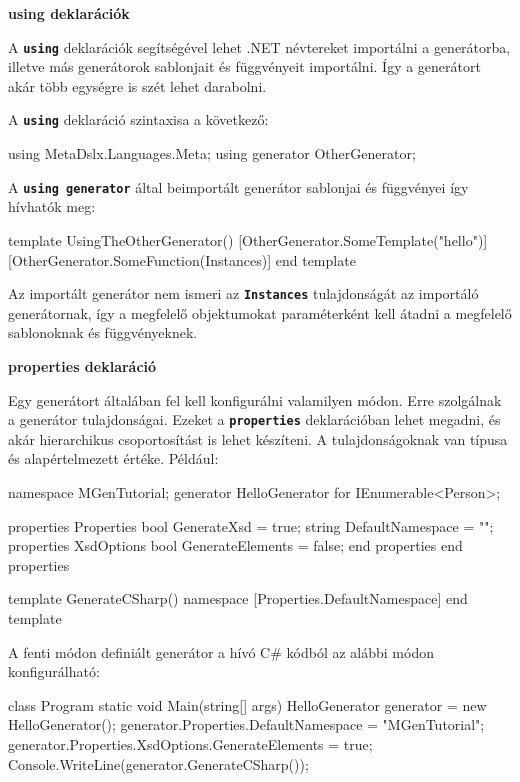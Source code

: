 \documentclass[12pt, a4paper]{report}
\newcommand{\ff}[1]{\textbf{\texttt{#1}}}
\newcommand{\bb}[1]{\textbf{#1}}
\begin{document}
\bb{using deklarációk}

A \ff{using} deklarációk segítségével lehet .NET névtereket importálni a generátorba, illetve más generátorok sablonjait és függvényeit importálni. Így a generátort akár több egységre is szét lehet darabolni.

A \ff{using} deklaráció szintaxisa a következő:

\begin{mgencode}
using MetaDslx.Languages.Meta;
using generator OtherGenerator;
\end{mgencode}

A \ff{using generator} által beimportált generátor sablonjai és függvényei így hívhatók meg:

\begin{mgencode}
template UsingTheOtherGenerator()
[OtherGenerator.SomeTemplate("hello")]
[OtherGenerator.SomeFunction(Instances)]
end template
\end{mgencode}

Az importált generátor nem ismeri az \ff{Instances} tulajdonságát az importáló generátornak, így a megfelelő objektumokat paraméterként kell átadni a megfelelő sablonoknak és függvényeknek.

\bb{properties deklaráció}

Egy generátort általában fel kell konfigurálni valamilyen módon. Erre szolgálnak a generátor tulajdonságai. Ezeket a \ff{properties} deklarációban lehet megadni, és akár hierarchikus csoportosítást is lehet készíteni. A tulajdonságoknak van típusa és alapértelmezett értéke. Például:

\begin{mgencode}
namespace MGenTutorial;
generator HelloGenerator for IEnumerable<Person>;

properties Properties
  bool GenerateXsd = true;
  string DefaultNamespace = "";
  properties XsdOptions
    bool GenerateElements = false;
  end properties
end properties

template GenerateCSharp()
namespace [Properties.DefaultNamespace]
{
}
end template
\end{mgencode}

A fenti módon definiált generátor a hívó C\# kódból az alábbi módon konfigurálható:

\begin{csharpcode}
class Program
{
	static void Main(string[] args)
	{
		HelloGenerator generator = new HelloGenerator();
		generator.Properties.DefaultNamespace = "MGenTutorial";
		generator.Properties.XsdOptions.GenerateElements = true;
		Console.WriteLine(generator.GenerateCSharp());
	}
}
\end{csharpcode}
\end{document}
